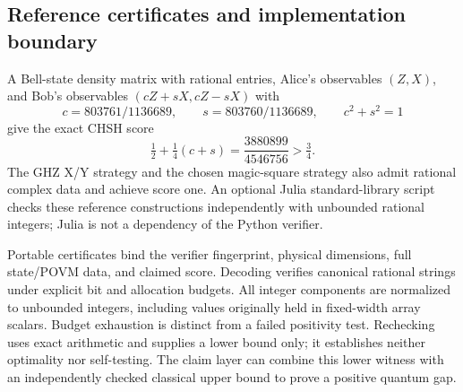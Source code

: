 \subsection{Reference certificates and implementation boundary}
A Bell-state density matrix with rational entries, Alice's observables $(Z,X)$,
and Bob's observables $(cZ+sX,cZ-sX)$ with
\[
 c=803761/1136689,\qquad s=803760/1136689,\qquad c^2+s^2=1
\]
give the exact CHSH score
\[
 \tfrac12+\tfrac14(c+s)=\frac{3880899}{4546756}>\tfrac34.
\]
The GHZ X/Y strategy and the chosen magic-square strategy also admit rational
complex data and achieve score one. An optional Julia standard-library script
checks these reference constructions independently with unbounded rational
integers; Julia is not a dependency of the Python verifier.

Portable certificates bind the verifier fingerprint, physical dimensions, full
state/POVM data, and claimed score. Decoding verifies canonical rational strings
under explicit bit and allocation budgets. All integer components are normalized
to unbounded integers, including values originally held in fixed-width array
scalars. Budget exhaustion is distinct from a failed positivity test. Rechecking
uses exact arithmetic and supplies a lower bound only; it establishes neither
optimality nor self-testing. The claim layer can combine this lower witness with
an independently checked classical upper bound to prove a positive quantum gap.
